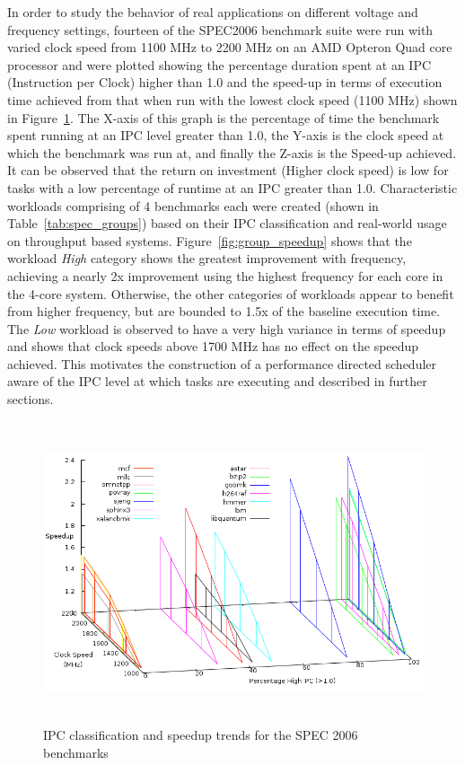 In order to study the behavior of real applications on different voltage and frequency settings,
fourteen of the SPEC2006 \cite{spec:2006} benchmark suite were run with varied clock speed 
from 1100 MHz to 2200 MHz on an AMD Opteron Quad core processor and were plotted showing the 
percentage duration spent at an IPC (Instruction per Clock) higher than 1.0 and the 
speed-up in terms of execution time achieved from that when run with the lowest clock speed (1100 MHz)
shown in Figure~\ref{fig:spec_classify}.
The X-axis of this graph is the percentage of time the benchmark spent running at an IPC level greater
than 1.0, the Y-axis is the clock speed at which the benchmark was run at, and finally the Z-axis 
is the Speed-up achieved. It can be observed that the return on investment (Higher clock speed)
is low for tasks with a low percentage of runtime at an IPC greater than 1.0. Characteristic workloads
comprising of 4 benchmarks each were created (shown in Table~\ref{tab:spec_groups}) based on their IPC classification
and real-world usage on throughput based systems. Figure~\ref{fig:group_speedup} shows that the workload 
\textit{High} category shows the greatest improvement with frequency, achieving a nearly 2x improvement using the highest
frequency for each core in the 4-core system.  Otherwise, the other
categories of workloads appear to benefit from higher frequency, but
are bounded to 1.5x of the baseline execution time. The \textit{Low} workload is observed to have a very 
high variance in terms of speedup and shows that clock speeds above 1700 MHz has no effect on the speedup achieved.
This motivates the construction of a performance directed scheduler aware of the IPC
level at which tasks are executing and described in further sections. 

\begin{figure}[h!]
  \begin{center}
    \includegraphics[height=3.5in]{figures/Speedup_Classify.png}%
    \caption{IPC classification and speedup trends for the SPEC 2006 benchmarks}
    \label{fig:spec_classify}
  \end{center}
\end{figure}

